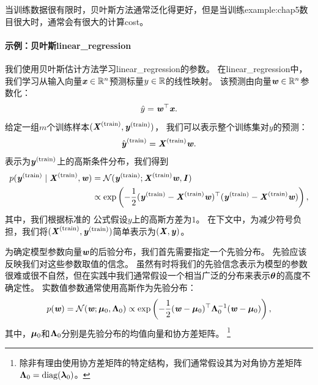 当训练数据很有限时，贝叶斯方法通常泛化得更好，但是当训练\gls{example:chap5}数目很大时，通常会有很大的计算\gls{cost}。


\paragraph{示例：贝叶斯\gls{linear_regression}}  我们使用贝叶斯估计方法学习\gls{linear_regression}的参数。
在\gls{linear_regression}中，我们学习从输入向量$\Vx\in\SetR^n$预测标量$y\in\SetR$的线性映射。
该预测由向量$\Vw \in \SetR^n$参数化：
\begin{equation}
    \hat{y} = \Vw^\Tsp \Vx .
\end{equation}
给定一组$m$个训练样本$(\MX^{(\text{train})}, \Vy^{(\text{train})})$，
我们可以表示整个训练集对$y$的预测：
\begin{equation}
    \hat{\Vy}^{(\text{train})} = \MX^{(\text{train})} \Vw .
\end{equation}
表示为$\Vy^{(\text{train})}$上的高斯条件分布，我们得到
\begin{align}
    p(\Vy^{(\text{train})} \mid \MX^{(\text{train})}, \Vw) &= 
    \mathcal{N}( \Vy^{(\text{train})}; \MX^{(\text{train})}\Vw, \MI ) \\
    & \propto \exp\left( 
        -\frac{1}{2}( \Vy^{(\text{train})} - \MX^{(\text{train})}\Vw )^\Tsp
        ( \Vy^{(\text{train})} - \MX^{(\text{train})}\Vw )
    \right),
\end{align}
其中，我们根据标准的\,\,公式假设$y$上的高斯方差为$1$。
在下文中，为减少符号负担，我们将$(\MX^{(\text{train})}, \Vy^{(\text{train})})$简单表示为$(\MX, \Vy)$。


为确定模型参数向量$\Vw$的后验分布，我们首先需要指定一个先验分布。
先验应该反映我们对这些参数取值的信念。
虽然有时将我们的先验信念表示为模型的参数很难或很不自然，但在实践中我们通常假设一个相当广泛的分布来表示$\Vtheta$的高度不确定性。
实数值参数通常使用高斯作为先验分布：
\begin{equation}
    p(\Vw) = \mathcal{N}( \Vw; \Vmu_0, \VLambda_0 ) 
    \propto \exp\left( 
    -\frac{1}{2}( \Vw-\Vmu_0 )^\Tsp \VLambda_0^{-1} ( \Vw-\Vmu_0 )
    \right),
\end{equation}
其中，$\Vmu_0$和$\VLambda_0$分别是先验分布的均值向量和协方差矩阵。
\footnote{除非有理由使用协方差矩阵的特定结构，我们通常假设其为对角协方差矩阵
$\VLambda_0=\text{diag}(\Vlambda_0)$。
}

